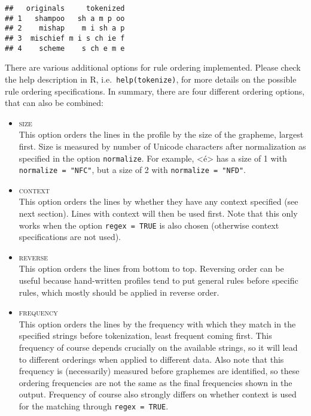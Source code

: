 \documentclass[output=book,nonflat,modfonts,
colorlinks, citecolor=brown,
		]{langsci/langscibook}\usepackage[]{graphicx}\usepackage[]{color}
\makeatletter
\newenvironment{kframe}{%
 \def\at@end@of@kframe{}%
 \ifinner\ifhmode%
  \def\at@end@of@kframe{\end{minipage}}%
  \begin{minipage}{\columnwidth}%
 \fi\fi%
 \def\FrameCommand##1{\hskip\@totalleftmargin \hskip-\fboxsep
 \colorbox{shadecolor}{##1}\hskip-\fboxsep
     \hskip-\linewidth \hskip-\@totalleftmargin \hskip\columnwidth}%
 \MakeFramed {\advance\hsize-\width
   \@totalleftmargin\z@ \linewidth\hsize
   \@setminipage}}%
 {\par\unskip\endMakeFramed%
 \at@end@of@kframe}
\newenvironment{knitrout}{}{} %
\makeatother
\begin{document}
\begin{knitrout}\footnotesize
{}\color{fgcolor}\begin{kframe}
\begin{verbatim}
##   originals     tokenized
## 1   shampoo   sh a m p oo
## 2    mishap    m i sh a p
## 3  mischief m i s ch ie f
## 4    scheme    s ch e m e
\end{verbatim}
\end{kframe}
\end{knitrout}

There are various additional options for rule ordering implemented. Please check
the help description in R, i.e.\ \texttt{help(tokenize)}, for more details on the
possible rule ordering specifications. In summary, there are four different 
ordering options, that can also be combined:

\begin{itemize}
  
   \item \textsc{size}\\
         This option orders the lines in the profile by the size of the
         grapheme, largest first. Size is measured by number of Unicode
         characters after normalization as specified in the option
         \texttt{normalize}. For example, <é> has a size of 1 with
         \texttt{normalize = "NFC"}, but a size of 2 with
         \texttt{normalize = "NFD"}.

   \item \textsc{context}\\ This option orders the lines by whether they have
           any context specified (see next section). Lines with context will
           then be used first. Note that this only works when the option
           \texttt{regex = TRUE} is also chosen (otherwise context
           specifications are not used).

   \item \textsc{reverse}\\ This option orders the lines from bottom to top.
         Reversing order can be useful because hand-written profiles tend to put
         general rules before specific rules, which mostly should be applied in
         reverse order.

  \item \textsc{frequency}\\
         This option orders the lines by the frequency with which they
         match in the specified strings before tokenization, least frequent
         coming first. This frequency of course depends crucially on the
         available strings, so it will lead to different orderings when applied
         to different data. Also note that this frequency is (necessarily)
         measured before graphemes are identified, so these ordering frequencies
         are not the same as the final frequencies shown in the output.
         Frequency of course also strongly differs on whether context is used
         for the matching through \texttt{regex = TRUE}.
  
\end{itemize}
\end{document}
